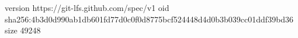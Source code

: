 version https://git-lfs.github.com/spec/v1
oid sha256:4b3d0d990ab1db601fd77d0c0f0d8775bcf524448d4d0b3b039cc01ddf39bd36
size 49248
